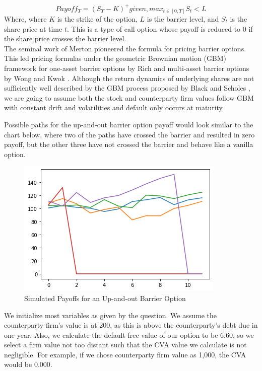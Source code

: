\documentclass[11pt]{article}
\begin{document}
\[
Payoff_T= (S_T - K)^+ given, max_{t \in [0,T]} S_t < L
\]
Where, where $K$ is the strike of the option, $L$ is the barrier level, and $S_t$ is the share price at time $t$.  This is a type of call option whose payoff is reduced to 0 if the share price crosses the barrier level. \\

The seminal work of Merton \cite{Merton1} pioneered the formula for pricing barrier options.  This led pricing formulas under the geometric Brownian motion (GBM) framework for one-asset barrier options by Rich \cite{RD1} and multi-asset barrier options by Wong and Kwok \cite{WK1}. Although the return dynamics of underlying shares are not sufficiently well described by the GBM process proposed by Black and Scholes \cite{BS1}, we are going to assume both the stock and counterparty firm values follow GBM  with constant drift and volatilities and default only occurs at maturity.

Possible paths for the up-and-out barrier option payoff would look similar to the chart below, where two of the paths have crossed the barrier and resulted in zero payoff, but the other three have not crossed the barrier and behave like a vanilla option.

\begin{figure}
    \centering
    \caption{Simulated Payoffs for an Up-and-out Barrier Option}
    \includegraphics{images/barrier-example.png}
\end{figure}

We initialize most variables as given by the question. We assume the
counterparty firm's value is at 200, as this is above the counterparty's
debt due in one year. Also, we calculate the default-free value of our
option to be 6.60, so we select a firm value not too distant such that
the CVA value we calculate is not negligible. For example, if we chose
counterparty firm value as 1,000, the CVA would be 0.000.
\end{document}
